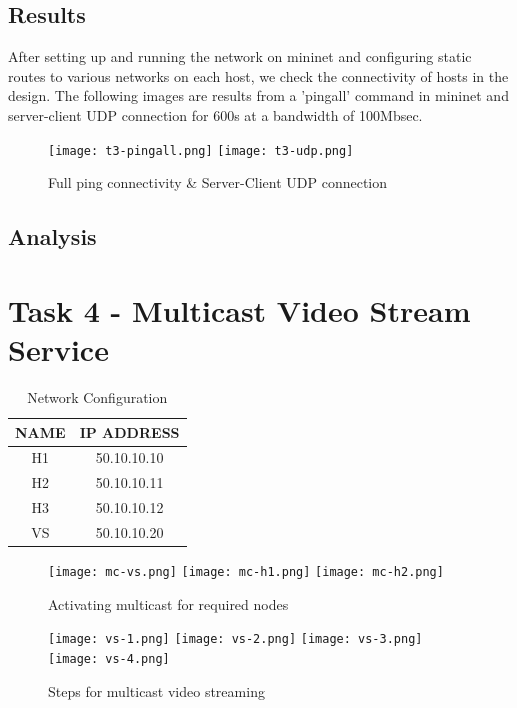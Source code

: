 \documentclass{article}
\begin{document}
\newpage
\subsection{Results}
After setting up and running the network on mininet and configuring static routes to various networks on each host, we check the connectivity of hosts in the design. The following images are results from a 'pingall' command in mininet and server-client UDP connection for 600s at a bandwidth of 100Mbsec.
  	\begin{figure}[h]
            	\centering
            	\texttt{[image: t3-pingall.png]}
            	\texttt{[image: t3-udp.png]}
            	\caption{Full ping connectivity \& Server-Client UDP connection}
            	\label{fig:t3-2}
        \end{figure}
        
\subsection{Analysis}

\newpage
\section{Task 4 - Multicast Video Stream Service}
    	\begin{table}[h]
        		\centering
        		\begin{tabular}{|c|c|}
            		\hline
            		NAME & IP ADDRESS \\
            		\hline
            		H1 & 50.10.10.10 \\
            		H2 & 50.10.10.11 \\
            		H3 & 50.10.10.12 \\
            		VS & 50.10.10.20 \\
            		\hline
        		\end{tabular}
        		\caption{Network Configuration}
        		\label{tab:5}
    	\end{table}
    	\begin{figure}[h]
        		\centering
        		\texttt{[image: mc-vs.png]}
        		\texttt{[image: mc-h1.png]}
        		\texttt{[image: mc-h2.png]}
        		\caption{Activating multicast for required nodes}
        		\label{fig:t4-1}
    	\end{figure}
    	\begin{figure}[h]
        		\texttt{[image: vs-1.png]}
        		\texttt{[image: vs-2.png]}
        		\texttt{[image: vs-3.png]}
        		\texttt{[image: vs-4.png]}
        		\caption{Steps for multicast video streaming}
        		\label{fig:t4-2}
    	\end{figure}
    
\end{document}
